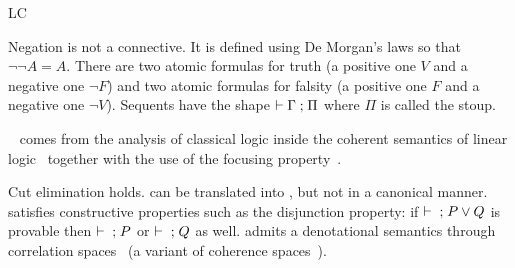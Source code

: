 \begin{entry}{LC}
\begin{clarifications}
Negation is not a connective. It is defined using De Morgan's laws so that $\neg\neg A=A$. There are two atomic formulas for truth (a positive one $V$ and a negative one $\neg F$) and two atomic formulas for falsity (a positive one $F$ and a negative one $\neg V$). Sequents have the shape $\vdash\Gamma\mathrel{;}\Pi$ where $\Pi$ is called the stoup.
\end{clarifications}

\begin{history}
\LC~\cite{lc} comes from the analysis of classical logic inside the coherent semantics of linear logic~\cite{ll} together with the use of the focusing property~\cite{focal}.
\end{history}

\begin{technicalities}
Cut elimination holds.
\LK{} can be translated into \LC, but not in a canonical manner.
\LC{} satisfies constructive properties such as the disjunction property: if $\vdash{}\mathrel{;} P\vee Q$ is provable then $\vdash{}\mathrel{;} P$ or $\vdash{}\mathrel{;} Q$ as well.
\LC{} admits a denotational semantics through correlation spaces~\cite{lc} (a variant of coherence spaces~\cite{ll}).
\end{technicalities}













\end{entry}



